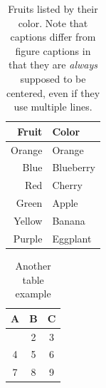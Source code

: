 \begin{table}[ht]
\caption[Fruits by color]{\centering Fruits listed by their color. Note that
captions differ from figure captions in that they are \textit{always} supposed
to be centered, even if they use multiple lines.}
\label{table_fruit}
\begin{center}
\begin{small}
\begin{tabular}{rl}
    \hline
    \abovespace\belowspace
    Fruit & Color  \\  \hline
    \abovespace Orange & Orange \\
    Blue & Blueberry \\
    Red & Cherry \\
    Green & Apple \\
    Yellow & Banana \\
    Purple & Eggplant \belowspace \\
    \hline
\end{tabular}
\end{small}
\end{center}
\end{table}

\begin{table}[ht]
\caption[A silly table]{Another table example}
\label{table_silly}
\begin{center}
\begin{small}
\begin{tabular}{ccc}
    \hline
    \abovespace\belowspace
    A & B & C \\  \hline
    \abovespace 1 & 2 & 3 \\
    4 & 5 & 6 \\
    7 & 8 & 9 \belowspace \\
    \hline
\end{tabular}
\end{small}
\end{center}
\end{table}
